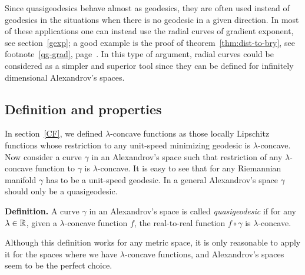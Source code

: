 \documentclass{article}
\begin{document}
Since quasigeodesics behave almost as geodesics, they are often used instead of geodesics in
the situations when there is no geodesic in a given direction.
In most of these applications one can instead use the radial curves of gradient
exponent, see section~\ref{gexp}; 
a good example is the proof of
theorem~\ref{thm:dist-to-bry}, see footnote~\ref{qg-grad},
page~\pageref{qg-grad}.
In this type of argument, radial curves could be considered as a simpler and
superior tool since they can be defined for infinitely dimensional Alexandrov's spaces. 









\subsection{Definition and properties}

In section~\ref{CF}, we defined $\lambda$-concave functions  as those locally
Lipschitz functions whose restriction to any unit-speed minimizing geodesic is
$\lambda$-concave. 
Now consider a curve $\gamma$ in an Alexandrov's space such that restriction of any
$\lambda$-concave function to $\gamma$ is $\lambda$-concave.
It is easy to see that for any Riemannian manifold $\gamma$ has to be a unit-speed
geodesic. 
In a general Alexandrov's space $\gamma$ should only be a
quasigeodesic.

\begin{thm}{\bf Definition.} A curve $\gamma$ in an Alexandrov's space is called
\emph{quasigeodesic} if for any $\lambda\in\mathbb{R}$, given a $\lambda$-concave
function $f$, the real-to-real function $f\circ\gamma$ is $\lambda$-concave.
\end{thm}

Although this definition works for any metric space, it is only reasonable to
apply it for the spaces where we have $\lambda$-concave functions, and
Alexandrov's spaces seem to be the perfect choice.
\end{document}
